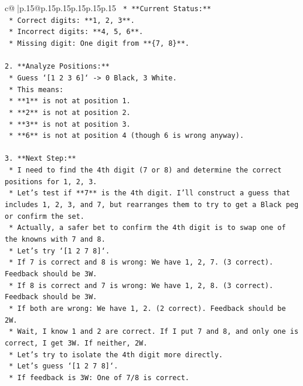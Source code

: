 \documentclass{article}
\begin{document}
{\begin{supertabular}{c@{$\;$}|p{.15\linewidth}@{}p{.15\linewidth}p{.15\linewidth}p{.15\linewidth}p{.15\linewidth}p{.15\linewidth}}
{{{\texttt{    *   **Current Status:**} \\
\texttt{        *   Correct digits: **1, 2, 3**.} \\
\texttt{        *   Incorrect digits: **4, 5, 6**.} \\
\texttt{        *   Missing digit: One digit from **\{7, 8\}**.} \\
\\ 
\texttt{2.  **Analyze Positions:**} \\
\texttt{    *   Guess `{[}1 2 3 6{]}` {-}> 0 Black, 3 White.} \\
\texttt{    *   This means:} \\
\texttt{        *   **1** is not at position 1.} \\
\texttt{        *   **2** is not at position 2.} \\
\texttt{        *   **3** is not at position 3.} \\
\texttt{        *   **6** is not at position 4 (though 6 is wrong anyway).} \\
\\ 
\texttt{3.  **Next Step:**} \\
\texttt{    *   I need to find the 4th digit (7 or 8) and determine the correct positions for 1, 2, 3.} \\
\texttt{    *   Let's test if **7** is the 4th digit. I'll construct a guess that includes 1, 2, 3, and 7, but rearranges them to try to get a Black peg or confirm the set.} \\
\texttt{    *   Actually, a safer bet to confirm the 4th digit is to swap one of the knowns with 7 and 8.} \\
\texttt{    *   Let's try `{[}1 2 7 8{]}`.} \\
\texttt{        *   If 7 is correct and 8 is wrong: We have 1, 2, 7. (3 correct). Feedback should be 3W.} \\
\texttt{        *   If 8 is correct and 7 is wrong: We have 1, 2, 8. (3 correct). Feedback should be 3W.} \\
\texttt{        *   If both are wrong: We have 1, 2. (2 correct). Feedback should be 2W.} \\
\texttt{    *   Wait, I know 1 and 2 are correct. If I put 7 and 8, and only one is correct, I get 3W. If neither, 2W.} \\
\texttt{    *   Let's try to isolate the 4th digit more directly.} \\
\texttt{    *   Let's guess `{[}1 2 7 8{]}`.} \\
\texttt{        *   If feedback is 3W: One of 7/8 is correct.} \\
}}}
\end{supertabular}}
\end{document}

